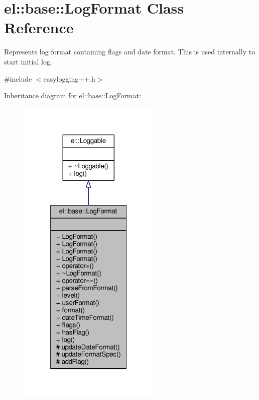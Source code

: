 \hypertarget{classel_1_1base_1_1LogFormat}{}\section{el\+:\+:base\+:\+:Log\+Format Class Reference}
\label{classel_1_1base_1_1LogFormat}


Represents log format containing flags and date format. This is used internally to start initial log.  




{\ttfamily \#include $<$easylogging++.\+h$>$}



Inheritance diagram for el\+:\+:base\+:\+:Log\+Format\+:
\nopagebreak
\begin{figure}[H]
\begin{center}
\leavevmode
\includegraphics[width=193pt]{db/d7f/classel_1_1base_1_1LogFormat__inherit__graph}
\end{center}
\end{figure}



